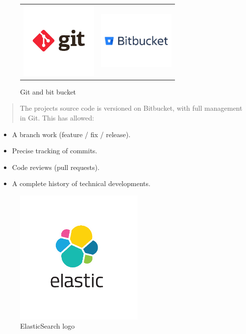 \documentclass[12pt,a4paper]{report}
\begin{document}
\begin{figure}[H]
\centering
\begin{tabular}{@{}c@{}c@{}}
\includegraphics[width=1.5in,height=1.5in]{media/image94.png} &
\includegraphics[width=1.5in,height=1.5in]{media/image95.png}
\end{tabular}
\caption{Git and bit bucket}
\label{fig:git-bitbucket}
\end{figure}


\begin{quote}
The project\textquotesingle s source code is versioned on Bitbucket,
with full management in Git. This has allowed:
\end{quote}

\begin{itemize}
\item A branch work (feature / fix / release).
\item Precise tracking of commits.
\item Code reviews (pull requests).
\item A complete history of technical developments.
\end{itemize}
\clearpage


\begin{figure}[H]
\centering
\includegraphics[width=2.5in]{media/image96.png}
\caption{ElasticSearch logo}
\label{fig:elasticsearch-logo}
\end{figure}
\end{document}
